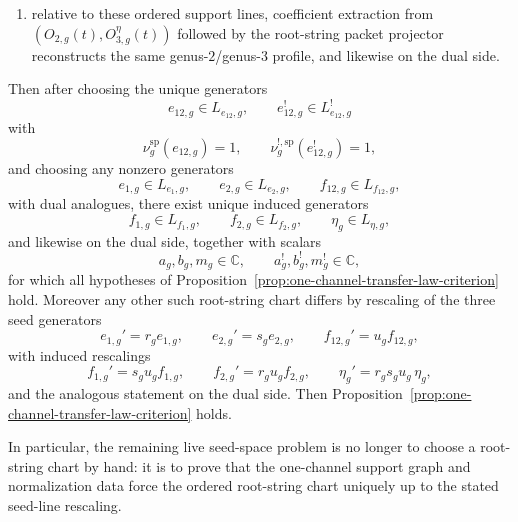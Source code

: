 \begin{proposition}
\begin{enumerate}[label=\textup{(\roman*)}]
  $L_{e_{12},g}\oplus L_{f_1,g}\oplus L_{f_2,g}$ and genus-$3$
  support exactly~$L_{\eta,g}$, with the same support profile on the
  dual side;
\item relative to these ordered support lines, coefficient extraction
  from $(O_{2,g}(t),O_{3,g}^\eta(t))$ followed by the root-string
  packet projector reconstructs the same genus-$2$/genus-$3$ profile,
  and likewise on the dual side.
\end{enumerate}
Then after choosing the unique generators
\[
e_{12,g}\in L_{e_{12},g},
\qquad
e_{12,g}^!\in L_{e_{12},g}^!
\]
with
\[
\nu_g^{\mathrm{sp}}(e_{12,g})=1,
\qquad
\nu_g^{!,\mathrm{sp}}(e_{12,g}^!)=1,
\]
and choosing any nonzero generators
\[
e_{1,g}\in L_{e_1,g},
\qquad
e_{2,g}\in L_{e_2,g},
\qquad
f_{12,g}\in L_{f_{12},g},
\]
with dual analogues, there exist unique induced generators
\[
f_{1,g}\in L_{f_1,g},
\qquad
f_{2,g}\in L_{f_2,g},
\qquad
\eta_g\in L_{\eta,g},
\]
and likewise on the dual side, together with scalars
\[
a_g,b_g,m_g\in\mathbb{C},
\qquad
a_g^!,b_g^!,m_g^!\in\mathbb{C},
\]
for which all hypotheses of
Proposition~\ref{prop:one-channel-transfer-law-criterion} hold.
Moreover any other such root-string chart differs by rescaling of the
three seed generators
\[
e_{1,g}'=r_g e_{1,g},
\qquad
e_{2,g}'=s_g e_{2,g},
\qquad
f_{12,g}'=u_g f_{12,g},
\]
with induced rescalings
\[
f_{1,g}'=s_g u_g f_{1,g},
\qquad
f_{2,g}'=r_g u_g f_{2,g},
\qquad
\eta_g'=r_g s_g u_g\,\eta_g,
\]
and the analogous statement on the dual side.
Then Proposition~\ref{prop:one-channel-transfer-law-criterion} holds.

In particular, the remaining live seed-space problem is no longer to
choose a root-string chart by hand: it is to prove that the one-channel
support graph and normalization data force the ordered root-string chart
uniquely up to the stated seed-line rescaling.
\end{proposition}

